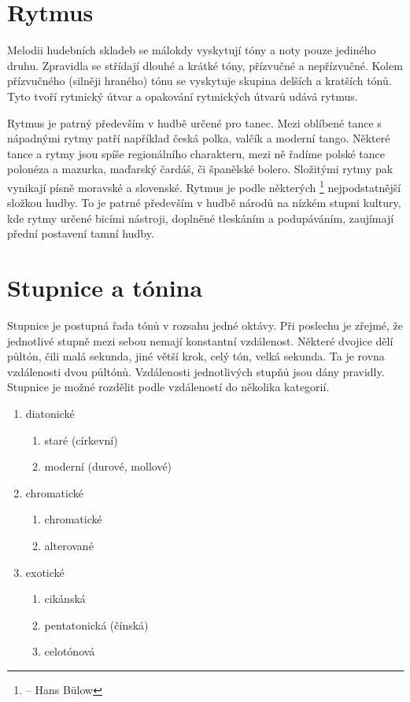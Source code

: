 \section{Rytmus}
Melodii hudebních skladeb se málokdy vyskytují tóny a noty pouze jediného druhu.
Zpravidla se střídají dlouhé a krátké tóny, přízvučné a nepřízvučné.
Kolem přízvučného (silněji hraného) tónu se vyskytuje skupina delších a kratších tónů.
Tyto tvoří rytmický útvar a opakování rytmických útvarů udává rytmus.

\par
Rytmus je patrný především v hudbě určené pro tanec.
Mezi oblíbené tance s nápadnými rytmy patří například česká polka,
valčík a moderní tango. 
Některé tance a rytmy jsou spíše regionálního charakteru, 
mezi ně řadíme polské tance polonéza a mazurka, maďarský čardáš, či španělské bolero.
Složitými rytmy pak vynikají písně moravské a slovenské.
Rytmus je podle některých
\footnote{ -- Hans Bülow} 
nejpodstatnější složkou hudby.
To je patrné především v hudbě národů na nízkém stupni kultury,
kde rytmy určené bicími nástroji, doplněné tleskáním a podupáváním,
zaujímají přední postavení tamní hudby.
\cite{cmiral}

\section{Stupnice a tónina}
\label{stupnice}

Stupnice je postupná řada tónů v rozsahu jedné oktávy.
Při poslechu je zřejmé, že jednotlivé stupně mezi sebou nemají konstantní vzdálenost.
\cite{kofron}
Některé dvojice dělí půltón, čili malá sekunda, 
jiné větší krok, celý tón, velká sekunda.
Ta je rovna vzdálenosti dvou půltónů.
Vzdálenosti jednotlivých stupňů jsou dány pravidly.
\cite{cmiral}
Stupnice je možné rozdělit podle vzdáleností do několika kategorií.

\begin{enumerate}
	\item diatonické
	\begin{enumerate}
        \item staré (církevní)
        \item moderní (durové, mollové)
    \end{enumerate}
	\item chromatické
	\begin{enumerate}
        \item chromatické
        \item alterované
    \end{enumerate}
	\item exotické
	\begin{enumerate}
        \item cikánská
        \item pentatonická (čínská)
        \item celotónová
    \end{enumerate}
\end{enumerate}

